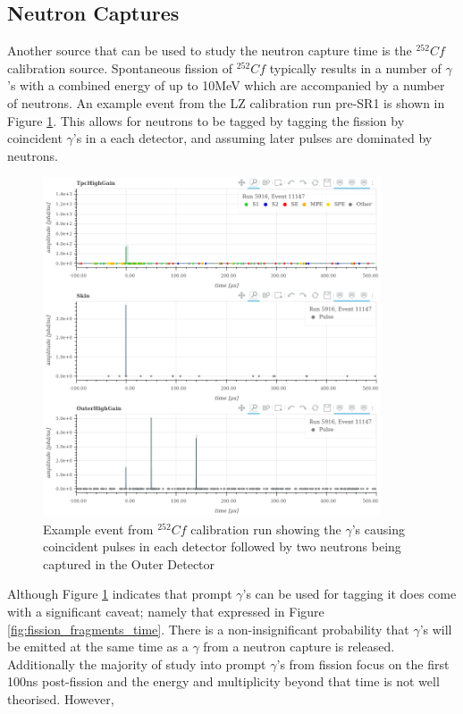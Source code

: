 \subsection{Neutron Captures}
\par
Another source that can be used to study the neutron capture time is the ${}^{252}{Cf}$ calibration source.
Spontaneous fission of ${}^{252}{Cf}$ typically results in a number of $\gamma$'s with a combined energy of up to 10MeV which are accompanied by a number of neutrons.
An example event from the LZ calibration run pre-SR1 is shown in Figure \ref{fig:cf252_event_viewer}.
This allows for neutrons to be tagged by tagging the fission by coincident $\gamma$'s in a each detector, and assuming later pulses are dominated by neutrons.

\begin{figure}[!htbp]
\includegraphics[width=10cm]{Figures/NeutronCaptureTime/cf252_eventviewer_5916.png}
\centering
\caption{Example event from ${}^{252}{Cf}$ calibration run showing the $\gamma$'s causing coincident pulses in each detector followed by two neutrons being captured in the Outer Detector}
\label{fig:cf252_event_viewer}
\end{figure}

\par
Although Figure \ref{fig:cf252_event_viewer} indicates that prompt $\gamma$'s can be used for tagging it does come with a significant caveat; namely that expressed in Figure \ref{fig:fission_fragments_time}.
There is a non-insignificant probability that $\gamma$'s will be emitted at the same time as a $\gamma$ from a neutron capture is released.
Additionally the majority of study into prompt $\gamma$'s from fission focus on the first 100ns post-fission and the energy and multiplicity beyond that time is not well theorised. 
However, 


